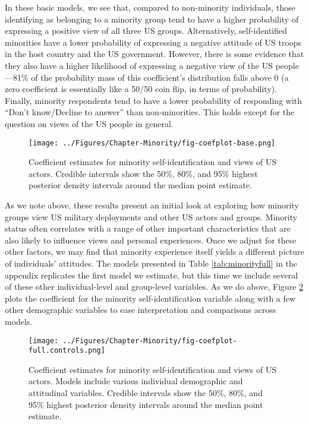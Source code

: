 In these basic models, we see that, compared to non-minority individuals, those identifying as belonging to a minority group tend to have a higher probability of expressing a positive view of all three US groups. Alternatively, self-identified minorities have a lower probability of expressing a negative attitude of US troops in the host country and the US government. However, there is some evidence that they also have a higher likelihood of expressing a negative view of the US people---81\% of the probability mass of this coefficient's distribution falls above 0 (a zero coefficient is essentially like a 50/50 coin flip, in terms of probability). Finally, minority respondents tend to have a lower probability of responding with ``Don't know/Decline to answer'' than non-minorities. This holds except for the question on views of the US people in general.

\begin{figure}[t]
	\texttt{[image: ../Figures/Chapter-Minority/fig-coefplot-base.png]}
	\caption{Coefficient estimates for minority self-identification and views of US actors. Credible intervals show the 50\%, 80\%, and 95\% highest posterior density intervals around the median point estimate. }
	\label{fig:minoritycoefbase}
\end{figure}


As we note above, these results present an initial look at exploring how minority groups view US military deployments and other US actors and groups. Minority status often correlates with a range of other important characteristics that are also likely to influence views and personal experiences. Once we adjust for these other factors, we may find that minority experience itself yields a different picture of individuals' attitudes. The models presented in Table \ref{tab:minorityfull} in the appendix replicates the first model we estimate, but this time we include several of these other individual-level and group-level variables. As we do above, Figure \ref{fig:minoritycoeffull} plots the coefficient for the minority self-identification variable along with a few other demographic variables to ease interpretation and comparisons across models. 


\begin{figure}[t]
	\texttt{[image: ../Figures/Chapter-Minority/fig-coefplot-full.controls.png]}
	\caption{Coefficient estimates for minority self-identification and views of US actors. Models include various individual demographic and attitudinal variables. Credible intervals show the 50\%, 80\%, and 95\% highest posterior density intervals around the median point estimate.}
	\label{fig:minoritycoeffull}
\end{figure}



